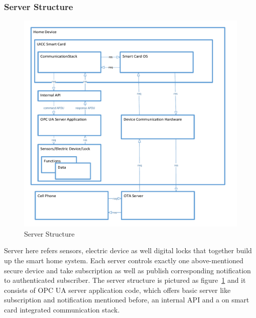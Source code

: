 \documentclass[]{llncs}
\begin{document}
\subsubsection{Server Structure}

\begin{figure}
	\centering
	\includegraphics[width=1.2\textwidth]{serverStructure}
		\caption[ ]{Server Structure}
	\label{fig:serverStructure}
\end{figure}
Server here refers sensors, electric device as well digital locks that together build up the smart home system. Each server controls exactly one above-mentioned secure device and take subscription as well as publish corresponding notification to authenticated subscriber. The server structure is pictured as figure~\ref{fig:serverStructure} and it consists of OPC UA server application code, which offers basic server like subscription and notification mentioned before, an internal API and a on smart card integrated communication stack.
\end{document}
